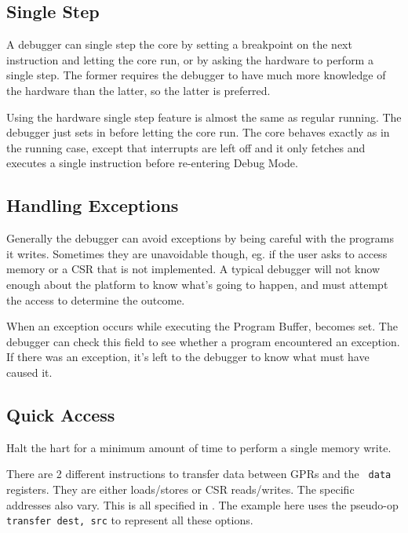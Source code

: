 \documentclass{article}
\begin{document}
\subsection{Single Step}

A debugger can single step the core by setting a breakpoint on the next
instruction and letting the core run, or by asking the hardware to perform a
single step. The former requires the debugger to have much more knowledge of
the hardware than the latter, so the latter is preferred.

Using the hardware single step feature is almost the same as regular running.
The debugger just sets \Fstep in \Rdcsr before letting the core run. The core
behaves exactly as in the running case, except that interrupts are left off and
it only fetches and executes a single instruction before re-entering Debug
Mode.

\subsection{Handling Exceptions}

Generally the debugger can avoid exceptions by being careful with the programs
it writes. Sometimes they are unavoidable though, eg. if the user asks to
access memory or a CSR that is not implemented. A typical debugger will not
know enough about the platform to know what's going to happen, and must attempt
the access to determine the outcome.

When an exception occurs while executing the Program Buffer, \Fcmderr becomes
set. The debugger can check this field to see whether a program encountered an
exception.  If there was an exception, it's left to the debugger to know what
must have caused it.

\subsection{Quick Access} \label{quickaccess}

Halt the hart for a minimum amount of time to perform a single memory write.

There are 2 different instructions to transfer data between GPRs and the {\tt
data} registers. They are either loads/stores or CSR reads/writes. The specific
addresses also vary. This is all specified in \Rhartinfo. The example here uses
the pseudo-op {\tt transfer dest, src} to represent all these options.
\end{document}
